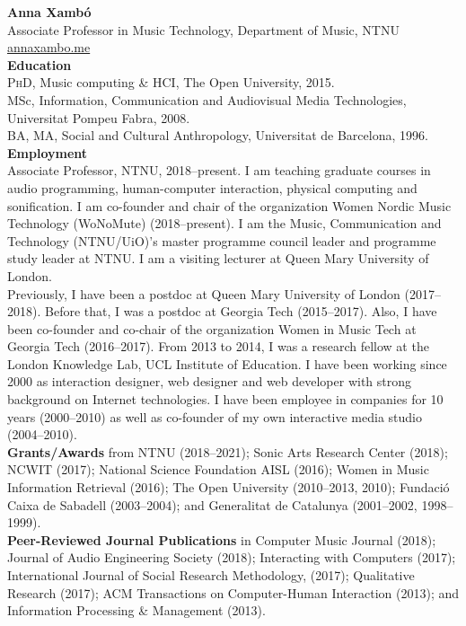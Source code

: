 \documentclass[10pt, a4paper]{article}
\begin{document}
{\textbf{Anna Xambó}}\\
Associate Professor in Music Technology, Department of Music, NTNU\\
\href{http://annaxambo.me/}{annaxambo.me}\\ 

{\textbf{Education}}\\
\textsc{PhD}, Music computing \& HCI, The Open University, 2015.\\
MSc, Information, Communication and Audiovisual Media Technologies, Universitat Pompeu Fabra, 2008.\\
BA, MA, Social and Cultural Anthropology, Universitat de Barcelona, 1996.\\

{\textbf{Employment}}\\
Associate Professor, NTNU, 2018--present. I am teaching graduate courses in audio programming, human-computer interaction, physical computing and sonification. I am co-founder and chair of the organization Women Nordic Music Technology (WoNoMute) (2018--present). I am the Music, Communication and Technology (NTNU/UiO)'s master programme council leader and programme study leader at NTNU. I am a visiting lecturer at Queen Mary University of London.\\
Previously, I have been a postdoc at Queen Mary University of London (2017--2018). Before that, I was a postdoc at Georgia Tech (2015--2017). Also, I have been co-founder and co-chair of the organization Women in Music Tech at Georgia Tech (2016--2017). From 2013 to 2014, I was a research fellow at the London Knowledge Lab, UCL Institute of Education.
I have been working since 2000 as interaction designer, web designer and web developer with strong background on Internet technologies. I have been employee in companies for 10 years (2000--2010) as well as co-founder of my own interactive media studio (2004--2010).\\

{\textbf{Grants/Awards}} from NTNU (2018--2021); Sonic Arts Research Center (2018); NCWIT (2017); National Science Foundation AISL (2016); Women in Music Information Retrieval (2016); The Open University (2010--2013, 2010); Fundació Caixa de Sabadell (2003--2004); and Generalitat de Catalunya (2001--2002, 1998--1999).\\

{\textbf{Peer-Reviewed Journal Publications}} in Computer Music Journal (2018); Journal of Audio Engineering Society (2018); Interacting with Computers (2017); International Journal of Social Research Methodology, (2017); Qualitative Research (2017); ACM Transactions on Computer-Human Interaction (2013); and Information Processing \& Management (2013).\\
\end{document}
